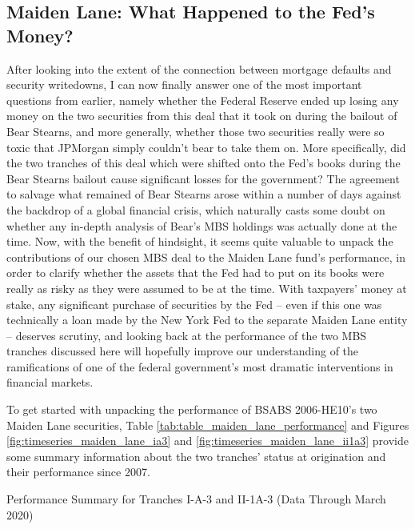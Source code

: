 \documentclass[12pt]{article}
\begin{document}
\subsection*{Maiden Lane: What Happened to the Fed's Money?}

After looking into the extent of the connection between mortgage defaults and security writedowns, I can now finally answer one of the most important questions from earlier, namely whether the Federal Reserve ended up losing any money on the two securities from this deal that it took on during the bailout of Bear Stearns, and more generally, whether those two securities really were so toxic that JPMorgan simply couldn’t bear to take them on. More specifically, did the two tranches of this deal which were shifted onto the Fed’s books during the Bear Stearns bailout cause significant losses for the government? The agreement to salvage what remained of Bear Stearns arose within a number of days against the backdrop of a global financial crisis, which naturally casts some doubt on whether any in-depth analysis of Bear’s MBS holdings was actually done at the time. Now, with the benefit of hindsight, it seems quite valuable to unpack the contributions of our chosen MBS deal to the Maiden Lane fund’s performance, in order to clarify whether the assets that the Fed had to put on its books were really as risky as they were assumed to be at the time. With taxpayers’ money at stake, any significant purchase of securities by the Fed – even if this one was technically a loan made by the New York Fed to the separate Maiden Lane entity – deserves scrutiny, and looking back at the performance of the two MBS tranches discussed here will hopefully improve our understanding of the ramifications of one of the federal government’s most dramatic interventions in financial markets.

	To get started with unpacking the performance of BSABS 2006-HE10’s two Maiden Lane securities, Table \ref{tab:table_maiden_lane_performance} and Figures \ref{fig:timeseries_maiden_lane_ia3} and \ref{fig:timeseries_maiden_lane_ii1a3} provide some summary information about the two tranches’ status at origination and their performance since 2007.

\begin{table}[H]
	\centering
	
	\caption{Performance Summary for Tranches I-A-3 and II-1A-3 (Data Through March 2020)}
	\label{tab:table_maiden_lane_performance}
\end{table}
\end{document}
